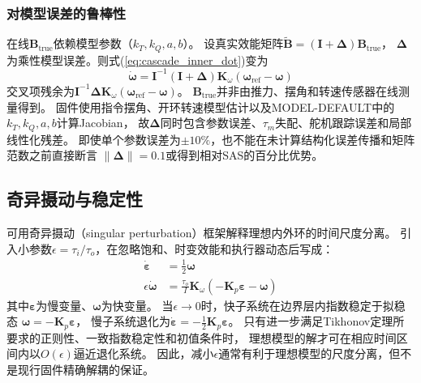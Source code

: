 \subsubsection{对模型误差的鲁棒性}

在线$\mathbf{B}_{\mathrm{true}}$依赖模型参数（$k_T,k_Q,a,b$）。
设真实效能矩阵$\tilde{\mathbf{B}}=(\mathbf{I}+\boldsymbol{\Delta})\mathbf{B}_{\mathrm{true}}$，
$\boldsymbol{\Delta}$为乘性模型误差。则式(\ref{eq:cascade_inner_dot})变为
\begin{equation}
    \dot{\boldsymbol{\omega}}
    = \mathbf{I}^{-1}(\mathbf{I}+\boldsymbol{\Delta})
      \mathbf{K}_\omega(\boldsymbol{\omega}_{\mathrm{ref}}-\boldsymbol{\omega})
    \label{eq:cascade_model_err}
\end{equation}
交叉项残余为$\mathbf{I}^{-1}\boldsymbol{\Delta}\mathbf{K}_\omega
(\boldsymbol{\omega}_{\mathrm{ref}}-\boldsymbol{\omega})$。
$\mathbf{B}_{\mathrm{true}}$并非由推力、摆角和转速传感器在线测量得到。
固件使用指令摆角、开环转速模型估计以及MODEL-DEFAULT中的$k_T,k_Q,a,b$计算Jacobian，
故$\boldsymbol\Delta$同时包含参数误差、$\tau_m$失配、舵机跟踪误差和局部线性化残差。
即使单个参数误差为$\pm10\%$，也不能在未计算结构化误差传播和矩阵范数之前直接断言
$\|\boldsymbol\Delta\|=0.1$或得到相对SAS的百分比优势。

\subsection{奇异摄动与稳定性}
\label{sec:cascade_sp}

可用奇异摄动（singular perturbation）框架解释理想内外环的时间尺度分离。
引入小参数$\epsilon=\tau_i/\tau_o$，在忽略饱和、时变效能和执行器动态后写成：
\begin{align}
    \dot{\boldsymbol{\varepsilon}} &= \frac{1}{2}\boldsymbol{\omega}
    \label{eq:sp_slow}\\
    \epsilon\dot{\boldsymbol{\omega}} &= \frac{\tau_o}{I}\mathbf{K}_\omega
    \left(-\mathbf{K}_p\boldsymbol{\varepsilon}-\boldsymbol{\omega}\right)
    \label{eq:sp_fast}
\end{align}
其中$\boldsymbol{\varepsilon}$为慢变量、$\boldsymbol{\omega}$为快变量。
当$\epsilon\to0$时，快子系统在边界层内指数稳定于拟稳态
$\boldsymbol{\omega}=-\mathbf{K}_p\boldsymbol{\varepsilon}$，
慢子系统退化为$\dot{\boldsymbol{\varepsilon}}=-\frac{1}{2}\mathbf{K}_p\boldsymbol{\varepsilon}$。
只有进一步满足Tikhonov定理所要求的正则性、一致指数稳定性和初值条件时，
理想模型的解才可在相应时间区间内以$O(\epsilon)$逼近退化系统\cite{tikhonov1952}。
因此，减小$\epsilon$通常有利于理想模型的尺度分离，但不是现行固件精确解耦的保证。

